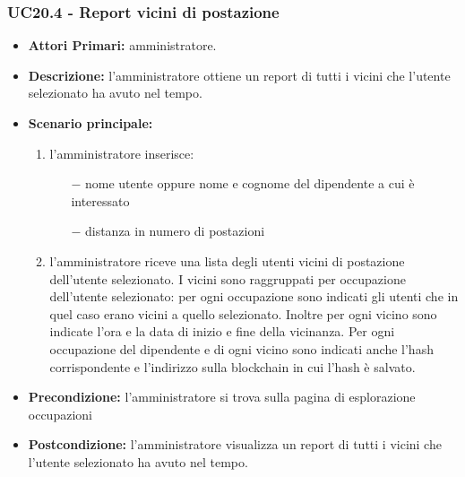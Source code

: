 \subsubsection{ UC20.4 - Report vicini di postazione}
\begin{itemize}
	\item\textbf{Attori Primari:} 
	amministratore.
	\item\textbf{Descrizione:} 
	l'amministratore ottiene un report di tutti i vicini che l'utente selezionato ha avuto nel tempo.
	\item\textbf{Scenario principale:} 
	\begin{enumerate}
		\item l'amministratore inserisce:
		\begin{itemize}
			\item[$-$] nome utente oppure nome e cognome del dipendente a cui è interessato
			\item[$-$] distanza in numero di postazioni
		\end{itemize}
		\item l'amministratore riceve una lista degli utenti vicini di postazione dell'utente selezionato. I vicini sono raggruppati per occupazione dell'utente selezionato: per ogni occupazione sono indicati gli utenti che in quel caso erano vicini a quello selezionato. Inoltre per ogni vicino sono indicate l'ora e la data di inizio e fine della vicinanza. Per ogni occupazione del dipendente e di ogni vicino sono indicati anche l'hash corrispondente e l'indirizzo sulla blockchain in cui l'hash è salvato.
	\end{enumerate}
	\item\textbf{Precondizione:} 
	l'amministratore si trova sulla pagina di esplorazione occupazioni
	\item\textbf{Postcondizione:}
	l'amministratore visualizza un report di tutti i vicini che l'utente selezionato ha avuto nel tempo.
\end{itemize}

